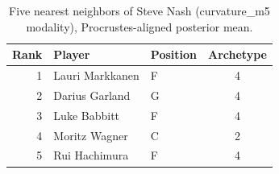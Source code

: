 \begin{table}[htbp]
  \centering\small
  \begin{tabular}{rllc}
    \toprule
    Rank & Player & Position & Archetype \\
    \midrule
    1 & Lauri Markkanen & F & 4 \\
    2 & Darius Garland & G & 4 \\
    3 & Luke Babbitt & F & 4 \\
    4 & Moritz Wagner & C & 2 \\
    5 & Rui Hachimura & F & 4 \\
    \bottomrule
  \end{tabular}
  \caption{Five nearest neighbors of Steve Nash (curvature_m5 modality), Procrustes-aligned posterior mean.}
  \label{tab:Steve_Nash_neighbors_curvature_m5}
\end{table}

